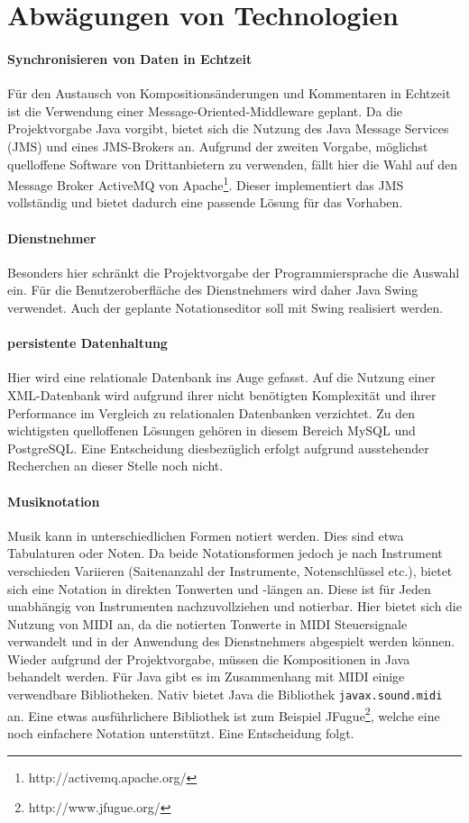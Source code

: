 \section{Abwägungen von Technologien}

\paragraph*{Synchronisieren von Daten in Echtzeit}
Für den Austausch von Kompositionsänderungen und Kommentaren in Echtzeit ist die Verwendung einer Message-Oriented-Middleware geplant. Da die Projektvorgabe Java vorgibt, bietet sich die Nutzung des Java Message Services (JMS) und eines JMS-Brokers an. Aufgrund der zweiten Vorgabe, möglichst quelloffene Software von Drittanbietern zu verwenden, fällt hier die Wahl auf den Message Broker ActiveMQ von Apache\footnote{http://activemq.apache.org/}. Dieser implementiert das JMS vollständig und bietet dadurch eine passende Lösung für das Vorhaben.

\paragraph*{Dienstnehmer}
Besonders hier schränkt die Projektvorgabe der Programmiersprache die Auswahl ein. Für die Benutzeroberfläche des Dienstnehmers wird daher Java Swing verwendet. Auch der geplante Notationseditor soll mit Swing realisiert werden.

\paragraph*{persistente Datenhaltung}
Hier wird eine relationale Datenbank ins Auge gefasst. Auf die Nutzung einer XML-Datenbank wird aufgrund ihrer nicht benötigten Komplexität und ihrer Performance im Vergleich zu relationalen Datenbanken verzichtet. Zu den wichtigsten quelloffenen Lösungen gehören in diesem Bereich MySQL und PostgreSQL. Eine Entscheidung diesbezüglich erfolgt aufgrund ausstehender Recherchen an dieser Stelle noch nicht.

\paragraph*{Musiknotation}
Musik kann in unterschiedlichen Formen notiert werden. Dies sind etwa Tabulaturen oder Noten. Da beide Notationsformen jedoch je nach Instrument verschieden Variieren (Saitenanzahl der Instrumente, Notenschlüssel etc.), bietet sich eine Notation in direkten Tonwerten und -längen an. Diese ist für Jeden unabhängig von Instrumenten nachzuvollziehen und notierbar. Hier bietet sich die Nutzung von MIDI an, da die notierten Tonwerte in MIDI Steuersignale verwandelt und in der Anwendung des Dienstnehmers abgespielt werden können. Wieder aufgrund der Projektvorgabe, müssen die Kompositionen in Java behandelt werden. Für Java gibt es im Zusammenhang mit MIDI einige verwendbare Bibliotheken. Nativ bietet Java die Bibliothek \texttt{javax.sound.midi} an. Eine etwas ausführlichere Bibliothek ist zum Beispiel JFugue\footnote{http://www.jfugue.org/}, welche eine noch einfachere Notation unterstützt. Eine Entscheidung folgt.

